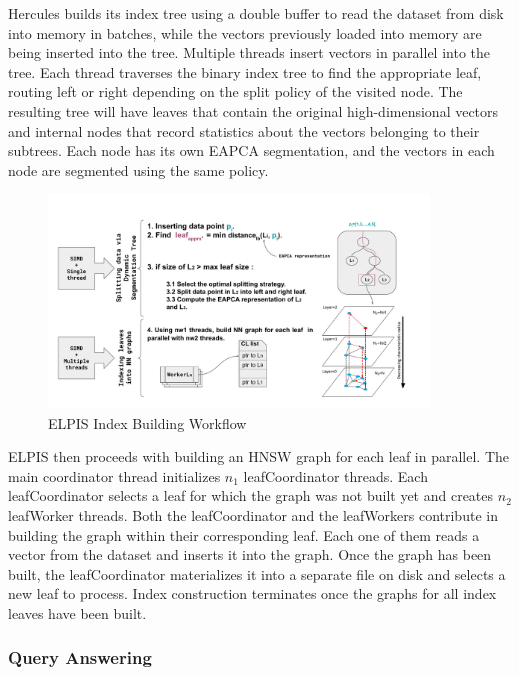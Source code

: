 Hercules builds its index tree using a double buffer to read the dataset from disk into memory in batches, while the vectors previously loaded into memory are being inserted into the tree. 
Multiple threads insert vectors in parallel into the tree. 
Each thread traverses the binary index tree to find the appropriate leaf, routing left or right depending on the split policy of the visited node. 
The resulting tree will have leaves that contain the original high-dimensional vectors and internal nodes that record statistics about the vectors belonging to their subtrees. 
Each node has its own EAPCA segmentation, and the vectors in each node are segmented using the same policy.

\begin{figure}[tb]
\captionsetup{justification=centering}	
\centering
\includegraphics[width=0.90\textwidth] {../img/elpis/indexing_wf.pdf}
\caption{ELPIS Index Building Workflow}
\label{fig:hercules-index-building}
\end{figure}

ELPIS then proceeds with building an HNSW graph for each leaf in parallel. 
The main coordinator thread initializes ${n_1}$ leafCoordinator threads. 
Each leafCoordinator selects a leaf for which the graph was not built yet and creates ${n_2}$ leafWorker threads. 
Both the leafCoordinator and the leafWorkers contribute in building the graph within their corresponding leaf. 
Each one of them reads a vector from the dataset and inserts it into the graph.  
Once the graph has been built, the leafCoordinator materializes it into a separate file on disk and selects a new leaf to process. 
Index construction terminates once the graphs for all index leaves have been built.

\subsubsection{Query Answering}

